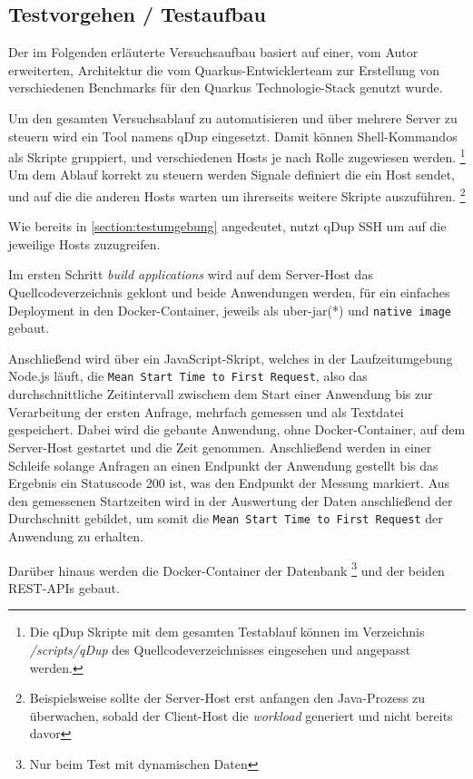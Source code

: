 \subsection{Testvorgehen / Testaufbau}
\label{section:vorgehen}
Der im Folgenden erläuterte Versuchsaufbau basiert auf einer, vom Autor erweiterten, Architektur die vom Quarkus-Entwicklerteam
zur Erstellung von verschiedenen Benchmarks für den Quarkus Technologie-Stack genutzt wurde.
\parencite{QuarkusBlog, QuarkusJohnaohara}

Um den gesamten Versuchsablauf zu automatisieren und über mehrere Server zu steuern wird ein Tool namens qDup eingesetzt.
Damit können Shell-Kommandos als Skripte gruppiert, und verschiedenen Hosts je nach Rolle zugewiesen werden.
\footnote{Die qDup Skripte mit dem gesamten Testablauf können im Verzeichnis \textit{/scripts/qDup} des Quellcodeverzeichnisses eingesehen und
    angepasst werden.}
Um dem Ablauf korrekt zu steuern werden Signale definiert die ein Host sendet, und auf die die anderen Hosts warten um ihrerseits
weitere Skripte auszuführen.
\footnote{Beispielsweise sollte der Server-Host erst anfangen den Java-Prozess zu überwachen, sobald der Client-Host die \textit{workload}
    generiert und nicht bereits davor}

Wie bereits in \ref{section:testumgebung} angedeutet, nutzt qDup SSH um auf die jeweilige Hosts zuzugreifen.

Im ersten Schritt \textit{build applications} wird auf dem Server-Host das Quellcodeverzeichnis geklont und beide Anwendungen werden, für
ein einfaches Deployment in den Docker-Container, jeweils als \gls{uber-jar}(*) und \verb|native image| gebaut.

Anschließend wird über ein JavaScript-Skript, welches in der Laufzeitumgebung Node.js läuft,
die \verb|Mean Start Time to First Request|, also das durchschnittliche Zeitintervall zwischem dem Start einer Anwendung bis
zur Verarbeitung der ersten Anfrage, mehrfach gemessen und als Textdatei gespeichert.
Dabei wird die gebaute Anwendung, ohne Docker-Container, auf dem Server-Host gestartet und die Zeit genommen. Anschließend werden in einer Schleife
solange Anfragen an einen Endpunkt der Anwendung gestellt bis das Ergebnis ein Statuscode 200 ist, was den Endpunkt der Messung markiert.
Aus den gemessenen Startzeiten wird in der Auswertung der Daten anschließend der Durchschnitt gebildet, um somit die \verb|Mean Start Time to First Request|
der Anwendung zu erhalten.

Darüber hinaus werden die Docker-Container der Datenbank
\footnote{Nur beim Test mit dynamischen Daten} und der beiden REST-APIs gebaut.

